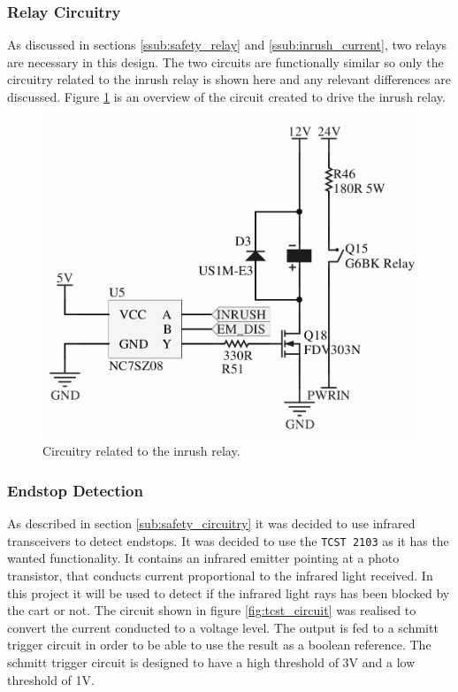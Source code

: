 \subsubsection{Relay Circuitry} %
\label{ssub:relay_circuitry}
As discussed in sections \ref{ssub:safety_relay} and \ref{ssub:inrush_current}, two relays are necessary in this design.
The two circuits are functionally similar so only the circuitry related to the inrush relay is shown here and any relevant differences are discussed.
Figure \ref{fig:relaycircuit} is an overview of the circuit created to drive the inrush relay.

\begin{figure}
	\centering
	\includegraphics[width=\linewidth]{graphics/relay_circuit}
	\caption{Circuitry related to the inrush relay.}
	\label{fig:relaycircuit}
\end{figure}


\subsubsection{Endstop Detection} %
\label{ssub:endstop_detection}
As described in section \ref{sub:safety_circuitry} it was decided to use infrared transceivers to detect endstops.
It was decided to use the \texttt{TCST 2103} as it has the wanted functionality.
It contains an infrared emitter pointing at a photo transistor, that conducts current proportional to the infrared light received.
In this project it will be used to detect if the infrared light rays has been blocked by the cart or not. 
The circuit shown in figure \ref{fig:tcst_circuit} was realised to convert the current conducted to a voltage level. 
The output is fed to a schmitt trigger circuit in order to be able to use the result as a boolean reference.
The schmitt trigger circuit is designed to have a high threshold of 3V and a low threshold of 1V. 


